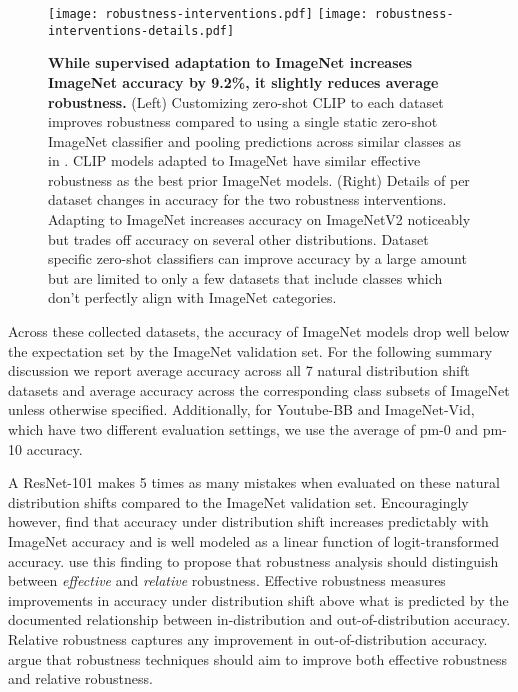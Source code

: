 \documentclass{article}
\begin{document}
\begin{figure*}[t]
\begin{center}
\texttt{[image: robustness-interventions.pdf]}
\texttt{[image: robustness-interventions-details.pdf]}
\caption{\textbf{While supervised adaptation to ImageNet increases ImageNet accuracy by 9.2\%, it slightly reduces average robustness.} (Left) Customizing zero-shot CLIP to each dataset improves robustness compared to using a single static zero-shot ImageNet classifier and pooling predictions across similar classes as in \citet{taori2020measuring}. CLIP models adapted to ImageNet have similar effective robustness as the best prior ImageNet models. (Right) Details of per dataset changes in accuracy for the two robustness interventions. Adapting to ImageNet increases accuracy on ImageNetV2 noticeably but trades off accuracy on several other distributions. Dataset specific zero-shot classifiers can improve accuracy by a large amount but are limited to only a few datasets that include classes which don't perfectly align with ImageNet categories.}
\label{robustness_interventions}
\end{center}
\end{figure*}

Across these collected datasets, the accuracy of ImageNet models drop well below the expectation set by the ImageNet validation set. For the following summary discussion we report average accuracy across all 7 natural distribution shift datasets and average accuracy across the corresponding class subsets of ImageNet unless otherwise specified. Additionally, for Youtube-BB and ImageNet-Vid, which have two different evaluation settings, we use the average of pm-0 and pm-10 accuracy. 

A ResNet-101 makes 5 times as many mistakes when evaluated on these natural distribution shifts compared to the ImageNet validation set. Encouragingly however, \citet{taori2020measuring} find that accuracy under distribution shift increases predictably with ImageNet accuracy and is well modeled as a linear function of logit-transformed accuracy. \citet{taori2020measuring} use this finding to propose that robustness analysis should distinguish between \textit{effective} and \textit{relative} robustness. Effective robustness measures improvements in accuracy under distribution shift above what is predicted by the documented relationship between in-distribution and out-of-distribution accuracy. Relative robustness captures any improvement in out-of-distribution accuracy. \citet{taori2020measuring} argue that robustness techniques should aim to improve both effective robustness and relative robustness.
\end{document}
